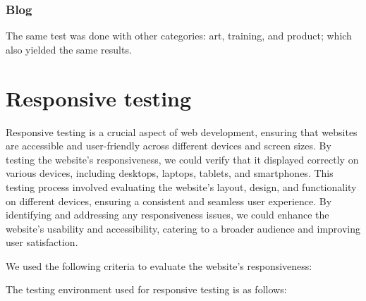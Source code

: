 





\subsubsection*{Blog}





The same test was done with other categories: art, training, and product; which also yielded the same results.





\section{Responsive testing}
Responsive testing is a crucial aspect of web development, ensuring that
websites are accessible and user-friendly across different devices and
screen sizes. By testing the website's responsiveness, we could verify
that it displayed correctly on various devices, including desktops,
laptops, tablets, and smartphones. This testing process involved
evaluating the website's layout, design, and functionality on different
devices, ensuring a consistent and seamless user experience. By
identifying and addressing any responsiveness issues, we could enhance
the website's usability and accessibility, catering to a broader audience
and improving user satisfaction.

We used the following criteria to evaluate the website's responsiveness:


The testing environment used for responsive testing is as follows:


